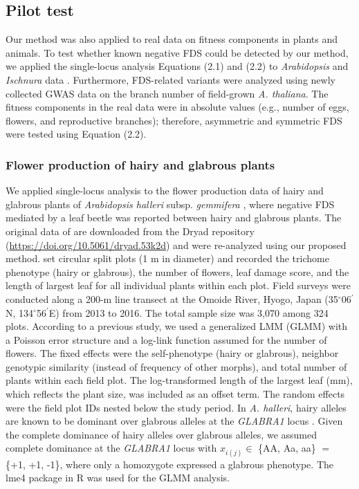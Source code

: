 \documentclass[12pt,]{article}
\begin{document}
\subsection{Pilot test}
Our method was also applied to real data on fitness components in plants and animals. To test whether known negative FDS could be detected by our method, we applied the single-locus analysis Equations (2.1) and (2.2) to \textit{Arabidopsis} and \textit{Ischnura} data \citep{sato2017herbivore, takahashi2014evolution}. Furthermore, FDS-related variants were analyzed using newly collected GWAS data on the branch number of field-grown \textit{A. thaliana}. The fitness components in the real data were in absolute values (e.g., number of eggs, flowers, and reproductive branches); therefore, asymmetric and symmetric FDS were tested using Equation (2.2).

\subsubsection{Flower production of hairy and glabrous plants}
We applied single-locus analysis to the flower production data of hairy and glabrous plants of \textit{Arabidopsis halleri} subsp. \textit{gemmifera} \citep{sato2017herbivore}, where negative FDS mediated by a leaf beetle was reported between hairy and glabrous plants. The original data of \cite{sato2017herbivore} are downloaded from the Dryad repository (\url{https://doi.org/10.5061/dryad.53k2d}) and were re-analyzed using our proposed method. \cite{sato2017herbivore} set circular split plots (1 m in diameter) and recorded the trichome phenotype (hairy or glabrous), the number of flowers, leaf damage score, and the length of largest leaf for all individual plants within each plot. Field surveys were conducted along a 200-m line transect at the Omoide River, Hyogo, Japan (35$^\circ$06$^\prime$N, 134$^\circ$56$^\prime$E) from 2013 to 2016. The total sample size was 3,070 among 324 plots. According to a previous study, we used a generalized LMM (GLMM) with a Poisson error structure and a log-link function assumed for the number of flowers. The fixed effects were the self-phenotype (hairy or glabrous), neighbor genotypic similarity (instead of frequency of other morphs), and total number of plants within each field plot. The log-transformed length of the largest leaf (mm), which reflects the plant size, was included as an offset term. The random effects were the field plot IDs nested below the study period. In \textit{A. halleri}, hairy alleles are known to be dominant over glabrous alleles at the \textit{GLABRA1} locus \citep{shimizu2002ecology, kawagoe2011coexistence}. Given the complete dominance of hairy alleles over glabrous alleles, we assumed complete dominance at the \textit{GLABRA1} locus with $x_{i(j)} \in$ \{AA, Aa, aa\} $=$ \{+1, +1, -1\}, where only a homozygote expressed a glabrous phenotype. The lme4 package \citep{bates2015} in R was used for the GLMM analysis.
\end{document}
